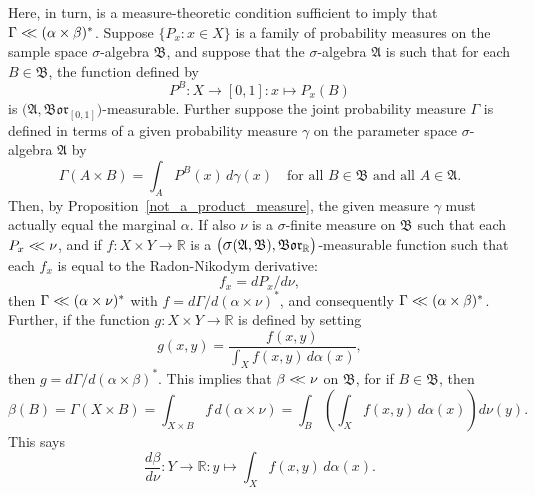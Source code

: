 \documentclass[
twoside=true,
paper=letter,
fontsize=9pt,
pagesize=auto,
leqno,
openany,
headsepline,
overfullrule,
]{scrbook}
\theoremstyle{plain}
\theoremstyle{plain}
\theoremstyle{definition}
\theoremstyle{bfnoteitalic}
\theoremstyle{bfnoteroman}
\newcommand{\sigalg}[1]{\mathfrak{#1}}
\newcommand{\borel}{\mathfrak{Bor}}
\newcommand{\sagb}{\mathop{\hbox{\large{$\sigma$}}}\nolimits}
\newcommand{\textsigma}{\hbox{\large{$\sigma$}}\kern-1pt}
\newcommand{\R}{\mathbb{R}}
\newcommand{\sigmaalgebra}{\sigalg{A}}
\newcommand{\sigmaalgebraii}{\sigalg{B}}
\newcommand{\productsig}[2]{\sagb(#1,#2)}
\newcommand{\funcf}{f}
\newcommand{\funcg}{g}
\newcommand{\function}{f}
\newcommand{\functionii}{g}
\newcommand{\measurespace}{X}
\newcommand{\measurespaceii}{Y}
\newcommand{\mspaceelt}{x}
\newcommand{\abscont}{\mathrel{< \kern-3.5pt <}}
\newcommand{\measnu}{\nu}
\newcommand{\setii}{B}
\newcommand{\pspace}{\measurespace}%
\newcommand{\sspace}{\measurespaceii}%
\newcommand{\pspaceset}{A}
\newcommand{\sspaceset}{B}
\newcommand{\pspaceelt}{x}
\newcommand{\sspaceelt}{y}
\newcommand{\sspacesig}{\sigalg{B}}
\newcommand{\pspacesig}{\sigalg{A}}
\newcommand{\joint}{\Gamma}%
\newcommand{\measonprod}{\Gamma}%
\newcommand{\marginalone}{\alpha}%
\newcommand{\marginaltwo}{\beta}%
\newcommand{\prior}{\marginalone}
\newcommand{\predictive}{\marginaltwo}
\newcommand{\wouldbeprior}{\gamma}
\begin{document}
Here, in turn, is a measure-theoretic condition sufficient to imply that
$\measonprod\abscont (\marginalone\times\marginaltwo)^*$.
Suppose
$\{ P_\mspaceelt :\mspaceelt\in\measurespace \}$
is a family of probability measures on the sample space \textsigma-algebra
$\sigmaalgebraii$,
and suppose that the \textsigma\hyp{}algebra $\sigmaalgebra$ is such that for each
$\setii\in\sigmaalgebraii$, the function defined by
\[
P^\setii
:\measurespace \to [0,1]
:\mspaceelt \mapsto P_\mspaceelt(\setii)
\]
is $\bigl(\sigmaalgebra,\borel_{[0,1]}\bigr)$\hyp{}measurable.
Further suppose the joint probability measure $\joint$  is defined in terms of
a given probability measure $\wouldbeprior$ on the parameter space \textsigma-algebra
$\pspacesig$ by
\[
\measonprod(\pspaceset\times\sspaceset)
=
\int_\pspaceset P^\sspaceset(\pspaceelt)
\, d\wouldbeprior(\pspaceelt)
\quad
\text{for all $\sspaceset\in\sspacesig$ and all $\pspaceset \in \pspacesig$.}
\]
Then, by Proposition~\ref{not_a_product_measure}, the given measure $\wouldbeprior$ must actually equal the marginal
$\prior$.
If also $\measnu$ is a \textsigma-finite measure on $\sspacesig$
such that each
$P_\pspaceelt\abscont \measnu$, and if
$\funcf : \pspace\times\sspace\to\R$ is a
$\bigl(\productsig{\pspacesig}{\sspacesig},\borel_\R\bigr)$\hyp{}measurable function
such that each $\funcf_\pspaceelt$ is equal to the Radon-Nikodym derivative:
\begin{equation}\label{as_density}
\function_\pspaceelt
=
d P_\pspaceelt/d\measnu,
\end{equation}
then
$\joint \abscont (\prior \times\measnu)^*$
with
$\function
=
d\measonprod/d(\prior \times\measnu)^*$,
and consequently
$\measonprod\abscont (\prior\times\predictive)^*$.
Further, if the function
$\funcg: \pspace\times\sspace\to\R$ is defined by setting
\[\functionii(\pspaceelt,\sspaceelt)
=
\frac
{\function(\pspaceelt,\sspaceelt)}
{\int_\pspace \function(\pspaceelt,\sspaceelt)\,
d\prior(\pspaceelt)},
\]
then
$\functionii
=
d\measonprod/d(\prior\times\predictive)^*$.
This implies that $\predictive \abscont \measnu$ on $\sspacesig$, for if $\sspaceset\in\sspacesig$, then
\[
\predictive(\sspaceset)
= \measonprod(\pspace \times \sspaceset)
= \int_{\pspace \times \sspaceset} \function \, d(\prior\times\measnu)
= \int_\sspaceset\left( \int_\pspace \function(\pspaceelt, \sspaceelt)\,d\prior(x)\right) d\measnu(\sspaceelt).
\]
This says
\[
\frac{d\predictive}{d\measnu}:
\sspace\to\R:
\sspaceelt\mapsto \int_\pspace \function(\pspaceelt,\sspaceelt)\,d\prior(x).
\]
\end{document}

